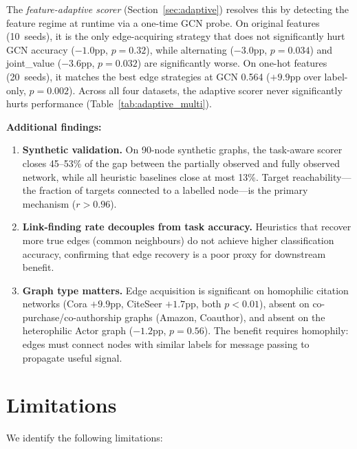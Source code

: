 \documentclass[12pt,a4paper,oneside]{report}
\begin{document}
The \emph{feature-adaptive scorer} (Section~\ref{sec:adaptive}) resolves this by detecting the feature regime at runtime via a one-time GCN probe. On original features (10~seeds), it is the only edge-acquiring strategy that does not significantly hurt GCN accuracy ($-1.0$pp, $p = 0.32$), while alternating ($-3.0$pp, $p = 0.034$) and joint\_value ($-3.6$pp, $p = 0.032$) are significantly worse. On one-hot features (20~seeds), it matches the best edge strategies at GCN 0.564 ($+9.9$pp over label-only, $p = 0.002$). Across all four datasets, the adaptive scorer never significantly hurts performance (Table~\ref{tab:adaptive_multi}).

\textbf{Additional findings:}
\begin{enumerate}[leftmargin=2em]
    \item \textbf{Synthetic validation.} On 90-node synthetic graphs, the task-aware scorer closes 45--53\% of the gap between the partially observed and fully observed network, while all heuristic baselines close at most 13\%. Target reachability---the fraction of targets connected to a labelled node---is the primary mechanism ($r > 0.96$).
    \item \textbf{Link-finding rate decouples from task accuracy.} Heuristics that recover more true edges (common neighbours) do not achieve higher classification accuracy, confirming that edge recovery is a poor proxy for downstream benefit.
    \item \textbf{Graph type matters.} Edge acquisition is significant on homophilic citation networks (Cora $+9.9$pp, CiteSeer $+1.7$pp, both $p < 0.01$), absent on co-purchase/co-authorship graphs (Amazon, Coauthor), and absent on the heterophilic Actor graph ($-1.2$pp, $p = 0.56$). The benefit requires homophily: edges must connect nodes with similar labels for message passing to propagate useful signal.
\end{enumerate}

\section{Limitations}

We identify the following limitations:
\end{document}
